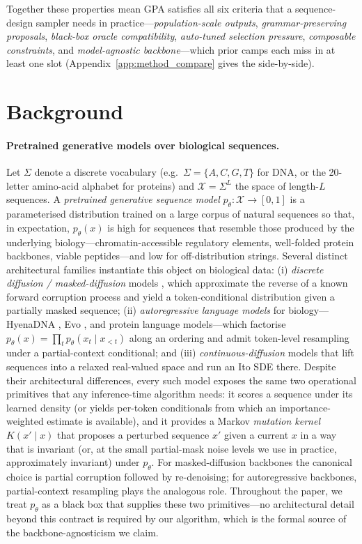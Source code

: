 \documentclass{article}
\theoremstyle{definition}
\theoremstyle{remark}
\newcommand{\gpa}{\textsc{GPA}\xspace}
\begin{document}
\noindent Together these properties mean \gpa{} satisfies all six criteria that a sequence-design sampler needs in practice---\emph{population-scale outputs}, \emph{grammar-preserving proposals}, \emph{black-box oracle compatibility}, \emph{auto-tuned selection pressure}, \emph{composable constraints}, and \emph{model-agnostic backbone}---which prior camps each miss in at least one slot (Appendix~\ref{app:method_compare} gives the side-by-side).

\section{Background}\label{sec:bg}

\paragraph{Pretrained generative models over biological sequences.}
Let $\Sigma$ denote a discrete vocabulary (e.g.\ $\Sigma=\{A,C,G,T\}$ for DNA, or the 20-letter amino-acid alphabet for proteins) and $\mathcal{X}=\Sigma^L$ the space of length-$L$ sequences. A \emph{pretrained generative sequence model} $p_\theta:\mathcal{X}\!\to\![0,1]$ is a parameterised distribution trained on a large corpus of natural sequences so that, in expectation, $p_\theta(x)$ is high for sequences that resemble those produced by the underlying biology---chromatin-accessible regulatory elements, well-folded protein backbones, viable peptides---and low for off-distribution strings. Several distinct architectural families instantiate this object on biological data: (i) \emph{discrete diffusion / masked-diffusion} models \citep{austin2021d3pm,lou2024sedd,sahoo2024mdlm}, which approximate the reverse of a known forward corruption process and yield a token-conditional distribution given a partially masked sequence; (ii) \emph{autoregressive language models} for biology---HyenaDNA \citep{hyenadna2023}, Evo \citep{evo2024}, and protein language models---which factorise $p_\theta(x)=\prod_t p_\theta(x_t\!\mid\!x_{<t})$ along an ordering and admit token-level resampling under a partial-context conditional; and (iii) \emph{continuous-diffusion} models that lift sequences into a relaxed real-valued space and run an Ito SDE there. Despite their architectural differences, every such model exposes the same two operational primitives that any inference-time algorithm needs: it scores a sequence under its learned density (or yields per-token conditionals from which an importance-weighted estimate is available), and it provides a Markov \emph{mutation kernel} $K(x'\!\mid\!x)$ that proposes a perturbed sequence $x'$ given a current $x$ in a way that is invariant (or, at the small partial-mask noise levels we use in practice, approximately invariant) under $p_\theta$. For masked-diffusion backbones the canonical choice is partial corruption followed by re-denoising; for autoregressive backbones, partial-context resampling plays the analogous role. Throughout the paper, we treat $p_\theta$ as a black box that supplies these two primitives---no architectural detail beyond this contract is required by our algorithm, which is the formal source of the backbone-agnosticism we claim.
\end{document}
